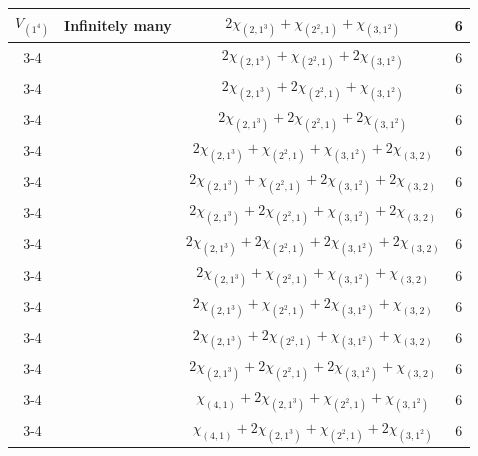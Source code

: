 \documentclass{amsart}
\theoremstyle{definition}
\theoremstyle{remark}
\numberwithin{equation}{section}
\begin{document}
\begin{center}
\begin{tabular}{|c|c|c|c|}
		\multirow{23}{*}{$V_{(1^4)}$}       & \multirow{23}{*}{Infinitely many } & $2\chi_{(2,1^3)}+\chi_{(2^2,1)}+\chi_{(3,1^2)}$                             & 6       \\
		\cline{3-4}
		&                                    & $2\chi_{(2,1^3)}+\chi_{(2^2,1)}+2\chi_{(3,1^2)}$                              & 6       \\
		\cline{3-4}
		&                                    & $2\chi_{(2,1^3)}+2\chi_{(2^2,1)}+\chi_{(3,1^2)}$                              & 6       \\
		\cline{3-4}
		&                                    & $2\chi_{(2,1^3)}+2\chi_{(2^2,1)}+2\chi_{(3,1^2)}$                             & 6       \\
		\cline{3-4}
		&                                    & $2\chi_{(2,1^3)}+\chi_{(2^2,1)}+\chi_{(3,1^2)}+2\chi_{(3,2)}$               & 6       \\
		\cline{3-4}
		&                                    & $2\chi_{(2,1^3)}+\chi_{(2^2,1)}+2\chi_{(3,1^2)}+2\chi_{(3,2)}$              & 6       \\
		\cline{3-4}
		&                                    & $2\chi_{(2,1^3)}+2\chi_{(2^2,1)}+\chi_{(3,1^2)}+2\chi_{(3,2)}$                & 6       \\
		\cline{3-4}
		&                                    & $2\chi_{(2,1^3)}+2\chi_{(2^2,1)}+2\chi_{(3,1^2)}+2\chi_{(3,2)}$               & 6       \\
		\cline{3-4}
		&                                    & $2\chi_{(2,1^3)}+\chi_{(2^2,1)}+\chi_{(3,1^2)}+\chi_{(3,2)}$                & 6       \\
		\cline{3-4}
		&                                    & $2\chi_{(2,1^3)}+\chi_{(2^2,1)}+2\chi_{(3,1^2)}+\chi_{(3,2)}$               & 6       \\
		\cline{3-4}
		&                                    & $2\chi_{(2,1^3)}+2\chi_{(2^2,1)}+\chi_{(3,1^2)}+\chi_{(3,2)}$                 & 6       \\
		\cline{3-4}
		&                                    & $2\chi_{(2,1^3)}+2\chi_{(2^2,1)}+2\chi_{(3,1^2)}+\chi_{(3,2)}$                & 6       \\
		\cline{3-4}
		&                                    & $\chi_{(4,1)}+2\chi_{(2,1^3)}+\chi_{(2^2,1)}+\chi_{(3,1^2)}$                & 6       \\
		\cline{3-4}
		&                                    & $\chi_{(4,1)}+2\chi_{(2,1^3)}+\chi_{(2^2,1)}+2\chi_{(3,1^2)}$               & 6       \\

\end{tabular}
\end{center}
\end{document}
